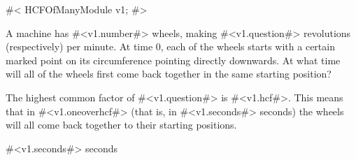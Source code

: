 


#<
HCFOfManyModule v1;
#>

A machine has #<v1.number#> wheels, making #<v1.question#> revolutions (respectively)
per minute. At time 0, each of the wheels starts with a certain marked point on
its circumference pointing directly downwards. At what time will all of the wheels first 
come back together in the same starting position?

The highest common factor of #<v1.question#> is #<v1.hcf#>. 
This means that in #<v1.oneoverhcf#> 
(that is, in #<v1.seconds#> seconds) the wheels will all come back together
to their starting positions. 


#<v1.seconds#> seconds

